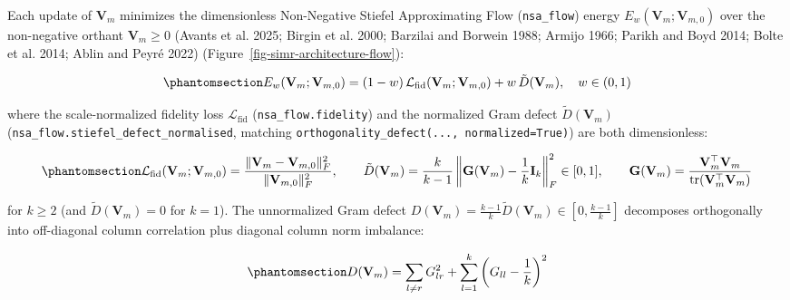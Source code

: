 \documentclass[
  10pt,
  letterpaper,
]{report}
\begin{document}
Each update of \(\mathbf{V}_m\) minimizes the dimensionless Non-Negative
Stiefel Approximating Flow (\texttt{nsa\_flow}) energy
\(E_w(\mathbf{V}_m; \mathbf{V}_{m,0})\) over the non-negative orthant
\(\mathbf{V}_m \ge 0\) (Avants et al. 2025; Birgin et al. 2000; Barzilai
and Borwein 1988; Armijo 1966; Parikh and Boyd 2014; Bolte et al. 2014;
Ablin and Peyré 2022) (Figure~\ref{fig-simr-architecture-flow}):

\begin{equation}\protect\phantomsection\label{eq-nsa-flow-energy}{
E_w(\mathbf{V}_m; \mathbf{V}_{m,0}) = (1 - w) \, \mathcal{L}_{\text{fid}}(\mathbf{V}_m; \mathbf{V}_{m,0}) + w \, \tilde{D}(\mathbf{V}_m), \quad w \in (0, 1)
}\end{equation}

where the scale-normalized fidelity loss \(\mathcal{L}_{\text{fid}}\)
(\texttt{nsa\_flow.fidelity}) and the normalized Gram defect
\(\tilde{D}(\mathbf{V}_m)\)
(\texttt{nsa\_flow.stiefel\_defect\_normalised}, matching
\texttt{orthogonality\_defect(...,\ normalized=True)}) are both
dimensionless:

\begin{equation}\protect\phantomsection\label{eq-gram-defect}{
\mathcal{L}_{\text{fid}}(\mathbf{V}_m; \mathbf{V}_{m,0}) = \frac{\|\mathbf{V}_m - \mathbf{V}_{m,0}\|_F^2}{\|\mathbf{V}_{m,0}\|_F^2}, \qquad \tilde{D}(\mathbf{V}_m) = \frac{k}{k - 1} \left\| \mathbf{G}(\mathbf{V}_m) - \frac{1}{k}\mathbf{I}_k \right\|_F^2 \in [0, 1], \qquad \mathbf{G}(\mathbf{V}_m) = \frac{\mathbf{V}_m^\top \mathbf{V}_m}{\operatorname{tr}(\mathbf{V}_m^\top \mathbf{V}_m)}
}\end{equation}

for \(k \ge 2\) (and \(\tilde{D}(\mathbf{V}_m) = 0\) for \(k = 1\)). The
unnormalized Gram defect
\(D(\mathbf{V}_m) = \frac{k - 1}{k}\tilde{D}(\mathbf{V}_m) \in [0, \frac{k-1}{k}]\)
decomposes orthogonally into off-diagonal column correlation plus
diagonal column norm imbalance:

\begin{equation}\protect\phantomsection\label{eq-defect-decomposition}{
D(\mathbf{V}_m) = \sum_{l \neq r} G_{lr}^2 + \sum_{l=1}^k \left(G_{ll} - \frac{1}{k}\right)^2
}\end{equation}
\end{document}

